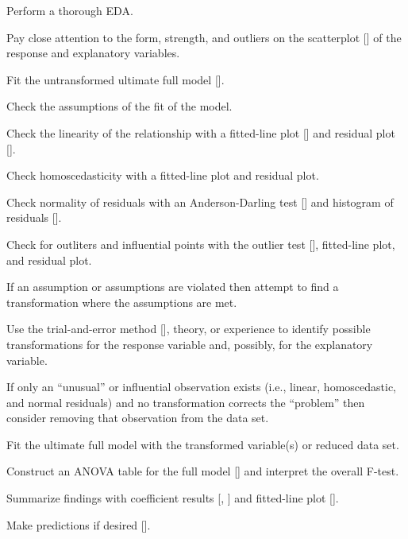 \documentclass[10pt,openany]{book}\usepackage[]{graphicx}\usepackage[]{color}
\begin{document}
\vspace{-10pt}
\begin{Enumerate}
  \item Perform a thorough EDA.
    \begin{Itemize}
      \item Pay close attention to the form, strength, and outliers on the scatterplot [] of the response and explanatory variables.
    \end{Itemize}
  \item Fit the untransformed ultimate full model [].
  \item Check the assumptions of the fit of the model.
    \begin{Itemize}
      \item Check the linearity of the relationship with a fitted-line plot [] and residual plot [].
      \item Check homoscedasticity with a fitted-line plot and residual plot.
      \item Check normality of residuals with an Anderson-Darling test [] and histogram of residuals [].
      \item Check for outliters and influential points with the outlier test [], fitted-line plot, and residual plot.
    \end{Itemize}
  \item If an assumption or assumptions are violated then attempt to find a transformation where the assumptions are met.
    \begin{Itemize}
      \item Use the trial-and-error method [], theory, or experience to identify possible transformations for the response variable and, possibly, for the explanatory variable.
      \item If only an ``unusual'' or influential observation exists (i.e., linear, homoscedastic, and normal residuals) and no transformation corrects the ``problem'' then consider removing that observation from the data set.
    \end{Itemize}
  \item Fit the ultimate full model with the transformed variable(s) or reduced data set.
  \item Construct an ANOVA table for the full model [] and interpret the overall F-test.
  \item Summarize findings with coefficient results [, ] and fitted-line plot [].
  \item Make predictions if desired [].
\end{Enumerate}
\end{document}
